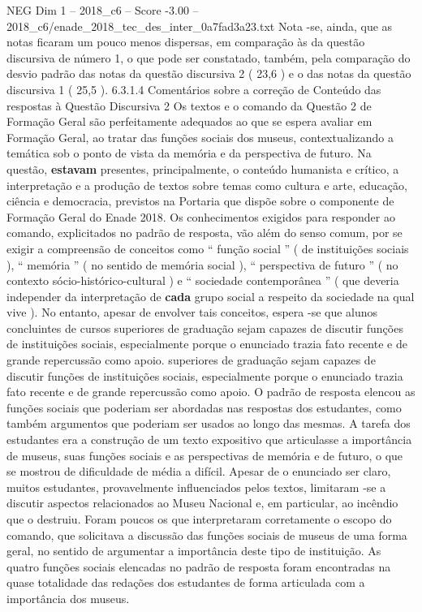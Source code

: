 \begin{textsample}{NEG Dim 1 – 2018\_c6 – Score -3.00 – 2018\_c6/enade\_2018\_tec\_des\_inter\_0a7fad3a23.txt}
Nota -se, ainda, que as notas ficaram um pouco menos dispersas, em comparação às da questão discursiva de número 1, o que pode ser constatado, também, pela comparação do desvio padrão das notas da questão discursiva 2 ( 23,6 ) e o das notas da questão discursiva 1 ( 25,5 ). 6.3.1.4 Comentários sobre a correção de Conteúdo das respostas à Questão Discursiva 2 Os textos e o comando da Questão 2 de Formação Geral são perfeitamente adequados ao que se espera avaliar em Formação Geral, ao tratar das funções sociais dos museus, contextualizando a temática sob o ponto de vista da memória e da perspectiva de futuro.
Na questão, \textbf{estavam} presentes, principalmente, o conteúdo humanista e crítico, a interpretação e a produção de textos sobre temas como cultura e arte, educação, ciência e democracia, previstos na Portaria que dispõe sobre o componente de Formação Geral do Enade 2018.
Os conhecimentos exigidos para responder ao comando, explicitados no padrão de resposta, vão além do senso comum, por se exigir a compreensão de conceitos como “ função social ” ( de instituições sociais ), “ memória ” ( no sentido de memória social ), “ perspectiva de futuro ” ( no contexto sócio-histórico-cultural ) e “ sociedade contemporânea ” ( que deveria independer da interpretação de \textbf{cada} grupo social a respeito da sociedade na qual vive ).
No entanto, apesar de envolver tais conceitos, espera -se que alunos concluintes de cursos superiores de graduação sejam capazes de discutir funções de instituições sociais, especialmente porque o enunciado trazia fato recente e de grande repercussão como apoio. superiores de graduação sejam capazes de discutir funções de instituições sociais, especialmente porque o enunciado trazia fato recente e de grande repercussão como apoio.
O padrão de resposta elencou as funções sociais que poderiam ser abordadas nas respostas dos estudantes, como também argumentos que poderiam ser usados ao longo das mesmas.
A tarefa dos estudantes era a construção de um texto expositivo que articulasse a importância de museus, suas funções sociais e as perspectivas de memória e de futuro, o que se mostrou de dificuldade de média a difícil.
Apesar de o enunciado ser claro, muitos estudantes, provavelmente influenciados pelos textos, limitaram -se a discutir aspectos relacionados ao Museu Nacional e, em particular, ao incêndio que o destruiu.
Foram poucos os que interpretaram corretamente o escopo do comando, que solicitava a discussão das funções sociais de museus de uma forma geral, no sentido de argumentar a importância deste tipo de instituição.
As quatro funções sociais elencadas no padrão de resposta foram encontradas na quase totalidade das redações dos estudantes de forma articulada com a importância dos museus.

\end{textsample}
